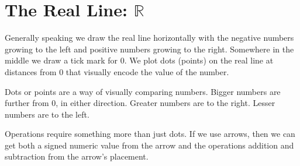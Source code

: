 \documentclass{ximera}
\begin{document}
\section{The Real Line:  $\mathbb{R}$}





Generally speaking we draw the real line horizontally with the negative numbers growing to the left and positive numbers growing to the right. Somewhere in the middle we draw a tick mark for $0$. We plot dots (points) on the real line at distances from $0$ that visually encode the value of the number.












  \begin{image}
  \end{image}


Dots or points are a way of visually comparing numbers.  Bigger numbers are further from $0$, in either direction.  Greater numbers are to the right.  Lesser numbers are to the left.




Operations require something more than just dots. If we use arrows, then we can get both a signed numeric value from the arrow and the operations addition and subtraction from the arrow's placement.
\end{document}
